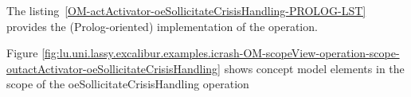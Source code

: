 	
	
	
	
	\vspace{1cm}
	The listing~\ref{OM-actActivator-oeSollicitateCrisisHandling-PROLOG-LST} provides the \msrmessir (Prolog-oriented) implementation of the operation.
	
	\scriptsize
	\vspace{0.5cm}
	
	
	\normalsize





Figure \ref{fig:lu.uni.lassy.excalibur.examples.icrash-OM-scopeView-operation-scope-outactActivator-oeSollicitateCrisisHandling}
shows concept model elements in the scope of the oeSollicitateCrisisHandling operation

